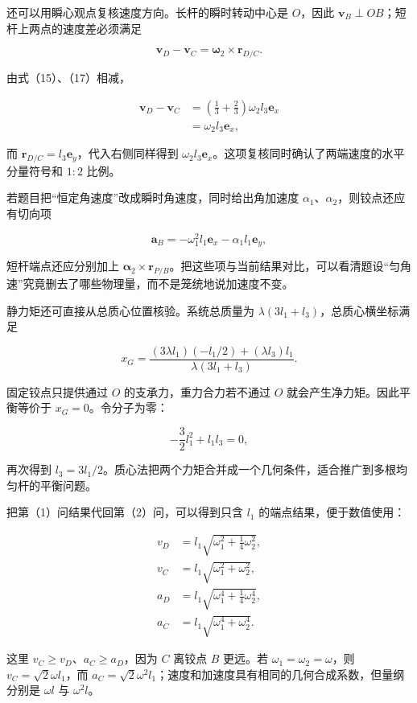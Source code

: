 \documentclass[12pt,a4paper,UTF8]{ctexart}
\begin{document}
还可以用瞬心观点复核速度方向。长杆的瞬时转动中心是 \(O\)，因此
\(\bm v_B\perp OB\)；短杆上两点的速度差必须满足

\[
\bm v_D-\bm v_C
=\bm\omega_2\times\bm r_{D/C}.
\]

由式（15）、（17）相减，

\[
\begin{aligned}
\bm v_D-\bm v_C
&=\left(\frac13+\frac23\right)\omega_2l_3\bm e_x\\
&=\omega_2l_3\bm e_x,
\end{aligned}
\]

而 \(\bm r_{D/C}=l_3\bm e_y\)，代入右侧同样得到
\(\omega_2l_3\bm e_x\)。这项复核同时确认了两端速度的水平分量符号和
\(1:2\) 比例。

若题目把``恒定角速度''改成瞬时角速度，同时给出角加速度
\(\alpha_1\)、\(\alpha_2\)，则铰点还应有切向项

\[
\bm a_B=-\omega_1^2l_1\bm e_x-\alpha_1l_1\bm e_y,
\]

短杆端点还应分别加上
\(\bm\alpha_2\times\bm r_{P/B}\)。把这些项与当前结果对比，可以看清题设``匀角速''究竟删去了哪些物理量，而不是笼统地说加速度不变。

静力矩还可直接从总质心位置核验。系统总质量为
\(\lambda(3l_1+l_3)\)，总质心横坐标满足

\[
x_G=\frac{(3\lambda l_1)(-l_1/2)+(\lambda l_3)l_1}
{\lambda(3l_1+l_3)}.
\]

固定铰点只提供通过 \(O\) 的支承力，重力合力若不通过 \(O\)
就会产生净力矩。因此平衡等价于 \(x_G=0\)。令分子为零：

\[
-\frac32l_1^2+l_1l_3=0,
\]

再次得到
\(l_3=3l_1/2\)。质心法把两个力矩合并成一个几何条件，适合推广到多根均匀杆的平衡问题。

把第（1）问结果代回第（2）问，可以得到只含 \(l_1\)
的端点结果，便于数值使用：

\[
\begin{aligned}
v_D&=l_1\sqrt{\omega_1^2+\frac14\omega_2^2},\\
v_C&=l_1\sqrt{\omega_1^2+\omega_2^2},\\
a_D&=l_1\sqrt{\omega_1^4+\frac14\omega_2^4},\\
a_C&=l_1\sqrt{\omega_1^4+\omega_2^4}.
\end{aligned}
\]

这里 \(v_C\ge v_D\)、\(a_C\ge a_D\)，因为 \(C\) 离铰点 \(B\) 更远。若
\(\omega_1=\omega_2=\omega\)，则 \(v_C=\sqrt2\omega l_1\)，而
\(a_C=\sqrt2\omega^2l_1\)；速度和加速度具有相同的几何合成系数，但量纲分别是
\(\omega l\) 与 \(\omega^2l\)。
\end{document}
